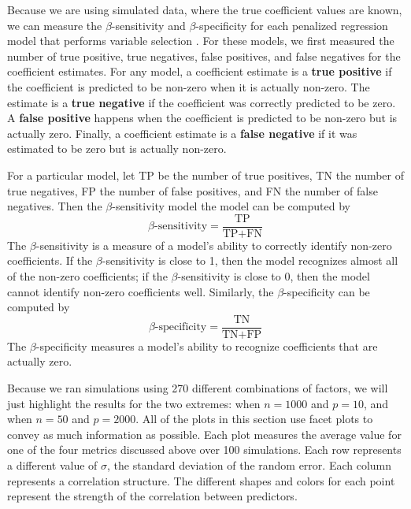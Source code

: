\documentclass{article}
\begin{document}
Because we are using simulated data, where the true coefficient values are known, we can measure the $\beta$-sensitivity and $\beta$-specificity for each penalized regression model that performs variable selection \cite{liu2020logsum}. For these models, we first measured the number of true positive, true negatives, false positives, and false negatives for the coefficient estimates. For any model, a coefficient estimate is a \textbf{true positive} if the coefficient is predicted to be non-zero when it is actually non-zero. The estimate is a \textbf{true negative} if the coefficient was correctly predicted to be zero. A \textbf{false positive} happens when the coefficient is predicted to be non-zero but is actually zero. Finally, a coefficient estimate is a \textbf{false negative} if it was estimated to be zero but is actually non-zero.

For a particular model, let TP be the number of true positives, TN the number of true negatives, FP the number of false positives, and FN the number of false negatives. Then the $\beta$-sensitivity model the model can be computed by
\begin{equation}
	\beta\text{-sensitivity} = \frac{\text{TP}}{\text{TP} + \text{FN}}
\end{equation}
The $\beta$-sensitivity is a measure of a model's ability to correctly identify non-zero coefficients. If the $\beta$-sensitivity is close to 1, then the model recognizes almost all of the non-zero coefficients; if the $\beta$-sensitivity is close to 0, then the model cannot identify non-zero coefficients well. Similarly, the $\beta$-specificity can be computed by
\begin{equation}
	\beta\text{-specificity} = \frac{\text{TN}}{\text{TN} + \text{FP}}
\end{equation}
The $\beta$-specificity measures a model's ability to recognize coefficients that are actually zero.


Because we ran simulations using 270 different combinations of factors, we will just highlight the results for the two extremes: when $n = 1000$ and $p = 10$, and when $n = 50$ and $p = 2000$. All of the plots in this section use facet plots to convey as much information as possible. Each plot measures the average value for one of the four metrics discussed above over 100 simulations. Each row represents a different value of $\sigma$, the standard deviation of the random error. Each column represents a correlation structure. The different shapes and colors for each point represent the strength of the correlation between predictors.
\end{document}

